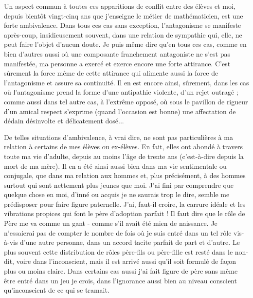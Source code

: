 Un aspect commun à toutes ces apparitions de conflit entre des élèves et moi, depuis bientôt vingt-cinq ans que j'enseigne le métier de mathématicien, est une forte ambivalence. Dans tous ces cas sans exception, l'antagonisme se manifeste après-coup, insidieusement souvent, dans une relation de sympathie qui, elle, ne peut faire l'objet d'aucun doute. Je puis même dire qu'en tous ces cas, comme en bien d'autres aussi où une composante franchement antagoniste ne s'est pas manifestée, ma personne a exercé et exerce encore une forte attirance. C'est sûrement la force même de cette attirance qui alimente aussi la force de l'antagonisme et assure sa continuité. Il en est encore ainsi, sûrement, dans les cas où l'antagonisme prend la forme d'une antipathie violente, d'un rejet outragé ; comme aussi dans tel autre cas, à l'extrême opposé, où sous le pavillon de rigueur d'un amical respect s'exprime (quand l'occasion est bonne) une affectation de dédain désinvolte et délicatement dosé...

De telles situations d'ambivalence, à vrai dire, ne sont pas particulières à ma relation à certains de mes élèves ou ex-élèves. En fait, elles ont abondé à travers toute ma vie d'adulte, depuis au moins l'âge de trente ans (c'est-à-dire depuis la mort de ma mère). Il en a été ainsi aussi bien dans ma vie sentimentale ou conjugale, que dans ma relation aux hommes et, plus précisément, à des hommes surtout qui sont nettement plus jeunes que moi. J'ai fini par comprendre que quelque chose en moi, d'inné ou acquis je ne saurais trop le dire, semble me prédisposer pour faire figure paternelle. J'ai, faut-il croire, la carrure idéale et les vibrations propices qui font le père d'adoption parfait ! Il faut dire que le rôle de Père me va comme un gant - comme s'il avait été mien de naissance. Je n'essaierai pas de compter le nombre de fois où je suis entré dans un tel rôle vis-à-vis d'une autre personne, dans un accord tacite parfait de part et d'autre. Le plus souvent cette distribution de rôles père-fils ou père-fille est resté dans le non-dit, voire dans l'inconscient, mais il est arrivé aussi qu'il soit formulé de façon plus ou moins claire. Dans certains cas aussi j'ai fait figure de père sans même être entré dans un jeu je crois, dans l'ignorance aussi bien au niveau conscient qu'inconscient de ce qui se tramait.

